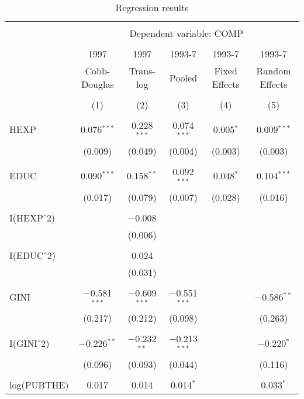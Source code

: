 \documentclass[12pt,a4paper]{article}\usepackage[]{graphicx}\usepackage[]{color}
\begin{document}
\begin{table}[!htbp] \centering 
  \caption{Regression results} 
  \label{tab:big} 
\scriptsize 
\begin{tabular}{@{\extracolsep{5pt}}lccccc} 
\\[-1.8ex]\hline 
\hline \\[-1.8ex] 
 & \multicolumn{5}{c}{Dependent variable: COMP} \\ 
\cline{2-6} 
\\[-1.8ex] & 1997 & 1997 & 1993-7 & 1993-7 & 1993-7 \\ 
 & Cobb-Douglas & Trans-log & Pooled & Fixed Effects & Random Effects \\ 
\\[-1.8ex] & (1) & (2) & (3) & (4) & (5)\\ 
\hline \\[-1.8ex] 
 HEXP & 0.076$^{***}$ & 0.228$^{***}$ & 0.074$^{***}$ & 0.005$^{*}$ & 0.009$^{***}$ \\ 
  & (0.009) & (0.049) & (0.004) & (0.003) & (0.003) \\ 
  & & & & & \\ 
 EDUC & 0.090$^{***}$ & 0.158$^{**}$ & 0.092$^{***}$ & 0.048$^{*}$ & 0.104$^{***}$ \\ 
  & (0.017) & (0.079) & (0.007) & (0.028) & (0.016) \\ 
  & & & & & \\ 
 I(HEXP$\hat{\mkern6mu}$2) &  & $-$0.008 &  &  &  \\ 
  &  & (0.006) &  &  &  \\ 
  & & & & & \\ 
 I(EDUC$\hat{\mkern6mu}$2) &  & 0.024 &  &  &  \\ 
  &  & (0.031) &  &  &  \\ 
  & & & & & \\ 
 GINI & $-$0.581$^{***}$ & $-$0.609$^{***}$ & $-$0.551$^{***}$ &  & $-$0.586$^{**}$ \\ 
  & (0.217) & (0.212) & (0.098) &  & (0.263) \\ 
  & & & & & \\ 
 I(GINI$\hat{\mkern6mu}$2) & $-$0.226$^{**}$ & $-$0.232$^{**}$ & $-$0.213$^{***}$ &  & $-$0.220$^{*}$ \\ 
  & (0.096) & (0.093) & (0.044) &  & (0.116) \\ 
  & & & & & \\ 
 log(PUBTHE) & 0.017 & 0.014 & 0.014$^{*}$ &  & 0.033$^{*}$ \\ 

\end{tabular}
\end{table}
\end{document}

